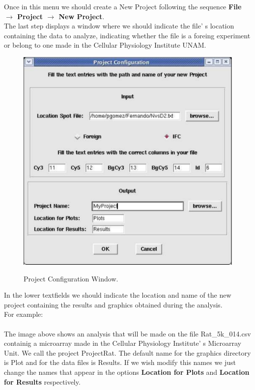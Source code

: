 \documentclass[12pt]{article}
\begin{document}
Once in this menu we should create a New Project following the sequence  \textbf{File $\rightarrow$ Project $\rightarrow$ New Project}.\\
The last step displays a window where we should indicate the file' s location containing the data to analyze, indicating whether the file is a foreing experiment or belong to one made in the Cellular Physiology Institute UNAM. 
\begin{figure}[h]
\begin{center}
\includegraphics[scale= 0.3]{./images/projectmenufilled.pdf}\\
\caption{Project Configuration Window. \label{fig2}}
\end{center}
\end{figure}

In the lower textfields we should indicate the location and name of the new project containing the results and graphics obtained during the analysis.\\
 For example:\\
 \\
The image above shows an analysis that will be made on the file Rat\_5k\_014.csv containig a microarray made in the Cellular Physiology Institute' s Microarray Unit. We call the project ProjectRat. The default name for the graphics directory is Plot and for the data files is Results. If we wish modify this names we just change the names that appear in the options \textbf{Location for Plots } and \textbf{Location for Results } respectively.\\
\end{document}
